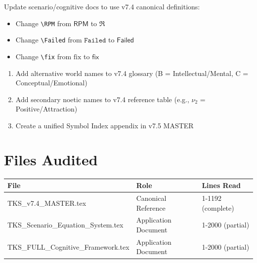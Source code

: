 \documentclass[11pt]{article}
\begin{document}
\begin{tcolorbox}[colback=blue!5!white,colframe=blue!75!black,title=\textbf{Priority 3: Harmonize Existing Commands}]
Update scenario/cognitive docs to use v7.4 canonical definitions:
\begin{itemize}
    \item Change \verb|\RPM| from $\mathsf{RPM}$ to $\mathfrak{R}$
    \item Change \verb|\Failed| from $\mathtt{Failed}$ to $\mathsf{Failed}$
    \item Change \verb|\fix| from $\mathrm{fix}$ to $\mathsf{fix}$
\end{itemize}
\end{tcolorbox}

\begin{tcolorbox}[colback=gray!10!white,colframe=gray!75!black,title=\textbf{Priority 4: Documentation Updates}]
\begin{enumerate}
    \item Add alternative world names to v7.4 glossary (B = Intellectual/Mental, C = Conceptual/Emotional)
    \item Add secondary noetic names to v7.4 reference table (e.g., $\nu_2$ = Positive/Attraction)
    \item Create a unified Symbol Index appendix in v7.5 MASTER
\end{enumerate}
\end{tcolorbox}

\section{Files Audited}

\begin{center}
\begin{tabular}{l|l|l}
\toprule
\textbf{File} & \textbf{Role} & \textbf{Lines Read} \\
\midrule
TKS\_v7.4\_MASTER.tex & Canonical Reference & 1-1192 (complete) \\
TKS\_Scenario\_Equation\_System.tex & Application Document & 1-2000 (partial) \\
TKS\_FULL\_Cognitive\_Framework.tex & Application Document & 1-2000 (partial) \\
\bottomrule
\end{tabular}
\end{center}
\end{document}
